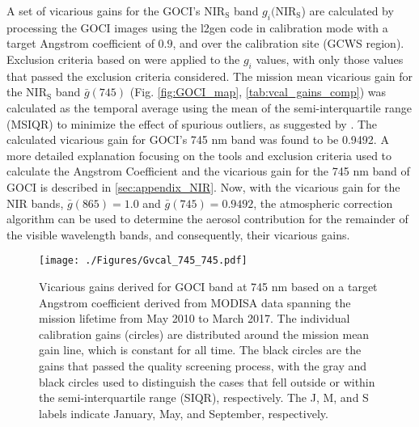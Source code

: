 \documentclass[]{interact}
\theoremstyle{plain}%
\theoremstyle{definition}
\theoremstyle{remark}
\begin{document}
A set of vicarious gains for the GOCI's $\text{NIR}_\text{S}$ band $g_i(\text{NIR}_\text{S}$) are calculated by processing the GOCI images using the l2gen code in calibration mode with a target Angstrom coefficient of $0.9$, and over the calibration site (GCWS region). Exclusion criteria based on \cite{Bailey2006} were applied to the $g_i$ values, with only those values that passed the exclusion criteria considered. The mission mean vicarious gain for the $\text{NIR}_\text{S}$ band $\bar{g}(745)$ (Fig. \ref{fig:GOCI_map}, \autoref{tab:vcal_gains_comp}) was calculated as the temporal average using the mean of the semi-interquartile range (MSIQR) to minimize the effect of spurious outliers, as suggested by \cite{Franz:07}. The calculated vicarious gain for GOCI's 745 nm band was found to be 0.9492. A more detailed explanation focusing on the tools and exclusion criteria used to calculate the Angstrom Coefficient and the vicarious gain for the 745 nm band of GOCI is described in \autoref{sec:appendix_NIR}. Now, with the vicarious gain for the NIR bands, $\bar{g}(865)=1.0$ and $\bar{g}(745)=0.9492$, the atmospheric correction algorithm can be used to determine the aerosol contribution for the remainder of the visible wavelength bands, and consequently, their vicarious gains. 




\begin{figure}[H]
  \centering
  \texttt{[image: ./Figures/Gvcal\_745\_745.pdf]}
    \caption{Vicarious gains derived for GOCI band at 745 nm based on a target Angstrom coefficient derived from MODISA data spanning the mission lifetime from May 2010 to March 2017. The individual calibration gains (circles) are distributed around the mission mean gain line, which is constant for all time. The black circles are the gains that passed the quality screening process, with the gray and black circles used to distinguish the cases that fell outside or within the semi-interquartile range (SIQR), respectively. The J, M, and S labels indicate January, May, and September, respectively. \label{fig:Gvcal_745}} 
\end{figure}
\end{document}
